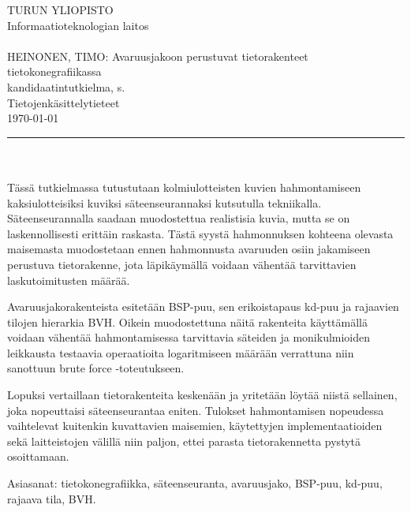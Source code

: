 \setlength{\hoffset}{-1in} \setlength{\oddsidemargin}{4cm} \addtolength{\textwidth}{1.3cm} \addtolength{\textheight}{1cm} \setlength{\voffset}{-1in}
\thispagestyle{empty}  %

\noindent
TURUN YLIOPISTO\\
Informaatioteknologian laitos\\
\\
HEINONEN, TIMO: Avaruusjakoon perustuvat tietorakenteet tietokonegrafiikassa\\
kandidaatintutkielma, \pageref{LastPage} s.\\
Tietojenkäsittelytieteet\\
\today\\
\rule{\textwidth}{.2mm}\\
\\
Tässä tutkielmassa tutustutaan kolmiulotteisten kuvien hahmontamiseen kaksiulotteisiksi kuviksi säteenseurannaksi kutsutulla tekniikalla. Säteenseurannalla saadaan muodostettua realistisia kuvia, mutta se on laskennollisesti erittäin raskasta. Tästä syystä hahmonnuksen kohteena olevasta maisemasta muodostetaan ennen hahmonnusta avaruuden osiin jakamiseen perustuva tietorakenne, jota läpikäymällä voidaan vähentää tarvittavien laskutoimitusten määrää.

\vspace{4mm}

Avaruusjakorakenteista esitetään BSP-puu, sen erikoistapaus kd-puu ja rajaavien tilojen hierarkia BVH. Oikein muodostettuna näitä rakenteita käyttämällä voidaan vähentää hahmontamisessa tarvittavia säteiden ja monikulmioiden leikkausta testaavia operaatioita logaritmiseen määrään verrattuna niin sanottuun brute force -toteutukseen. 

\vspace{4mm}

Lopuksi vertaillaan tietorakenteita keskenään ja yritetään löytää niistä sellainen, joka nopeuttaisi säteenseurantaa eniten. Tulokset hahmontamisen nopeudessa vaihtelevat kuitenkin kuvattavien maisemien, käytettyjen implementaatioiden sekä laitteistojen välillä niin paljon, ettei parasta tietorakennetta pystytä osoittamaan.


\vfill
\vspace{4mm}Asiasanat: tietokonegrafiikka, säteenseuranta, avaruusjako, BSP-puu, kd-puu, rajaava tila, BVH.

